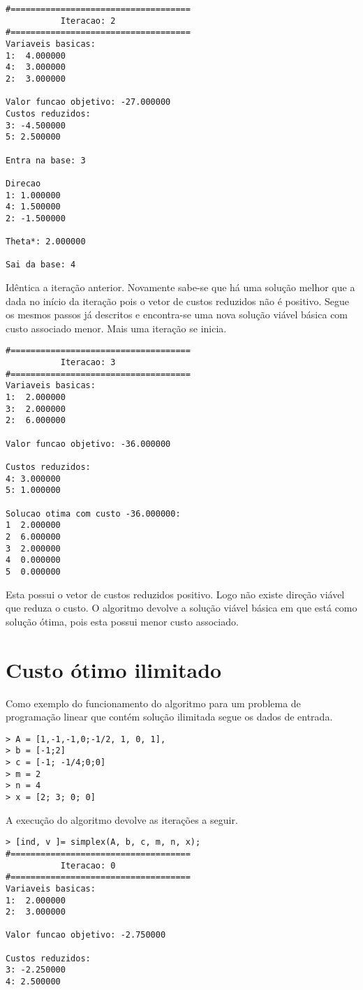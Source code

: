 \documentclass[
	12pt,				%
	openright,			%
	oneside,			%
	a4paper,			%
	english,			%
	french,				%
	spanish,			%
	brazil,				%
	]{abntex2}
\begin{document}
\begin{verbatim}
#====================================
           Iteracao: 2
#====================================
Variaveis basicas:
1:  4.000000
4:  3.000000
2:  3.000000

Valor funcao objetivo: -27.000000
Custos reduzidos:
3: -4.500000
5: 2.500000

Entra na base: 3

Direcao
1: 1.000000
4: 1.500000
2: -1.500000

Theta*: 2.000000

Sai da base: 4
\end{verbatim}

Idêntica a iteração anterior. Novamente sabe-se que há uma solução melhor que a dada no início da iteração pois o vetor de custos reduzidos não é positivo. Segue os mesmos passos já descritos e encontra-se uma nova solução viável básica com custo associado menor. Mais uma iteração se inicia.

\begin{verbatim}
#====================================
           Iteracao: 3
#====================================
Variaveis basicas:
1:  2.000000
3:  2.000000
2:  6.000000

Valor funcao objetivo: -36.000000

Custos reduzidos:
4: 3.000000
5: 1.000000

Solucao otima com custo -36.000000:
1  2.000000
2  6.000000
3  2.000000
4  0.000000
5  0.000000
\end{verbatim}
Esta possui o vetor de custos reduzidos positivo. Logo não existe direção viável que reduza o custo. O algoritmo devolve a solução viável básica em que está como solução ótima, pois esta possui menor custo associado.  
  
  
\section{Custo ótimo ilimitado}
Como exemplo do funcionamento do algoritmo para um problema de programação linear que contém solução ilimitada segue os dados de entrada.

\begin{verbatim}
> A = [1,-1,-1,0;-1/2, 1, 0, 1],
> b = [-1;2]
> c = [-1; -1/4;0;0]
> m = 2
> n = 4
> x = [2; 3; 0; 0]
\end{verbatim}

A execução do algoritmo devolve as iterações a seguir. 

\begin{verbatim}
> [ind, v ]= simplex(A, b, c, m, n, x);
#====================================
           Iteracao: 0
#====================================
Variaveis basicas:
1:  2.000000
2:  3.000000

Valor funcao objetivo: -2.750000

Custos reduzidos:
3: -2.250000
4: 2.500000
\end{verbatim}
\end{document}
